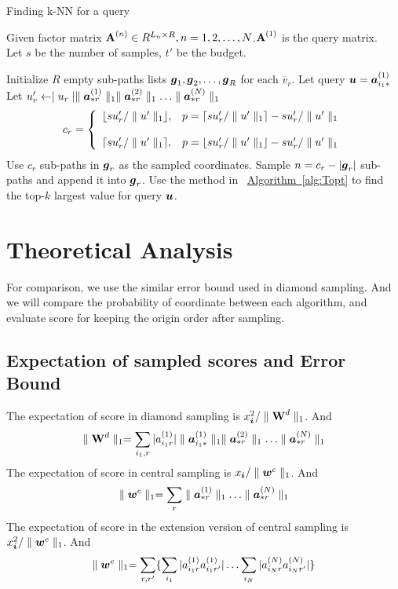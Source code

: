 \documentclass[letterpaper]{article}
\newcommand{\Sca}[3]{{#1}^{(#2)}_{i_#2#3}}%
\newcommand{\V}[1]{{\bm{{\MakeLowercase{#1}}}}}
\newcommand{\VnC}[3]{\V{#1}^{(#2)}_{#3}}
\newcommand{\Varow}[1]{\V{a}^{(#1)}_{i_#1*}}
\newcommand{\Vacol}[1]{\V{a}^{(#1)}_{*r}}
\newcommand{\M}[1]{{\bm{\mathbf{\MakeUppercase{#1}}}}}
\newcommand{\norm}[2]{\parallel#1\parallel_{#2}}
\newcommand{\Alg}[1] {\hyperref[alg:#1] {Algorithm~\ref*{alg:#1}}}
\begin{document}
\begin{algorithm}[t]
    \caption{Finding k-NN for a query}
    \label{alg:QuerySampling}
        Given factor matrix $\M{A}^{(n)}\in R^{L_n\times R}, n = 1,2,\ldots,N$.$\M{A}^{(1)}$ is the query matrix.\\
        Let $s$ be the number of samples, $t'$ be the budget.
    \begin{algorithmic}[1]
    \State Initialize $R$ empty sub-paths lists $\V{g}_1,\V{g}_2,\ldots,\V{g}_R$ for each $\overline{v}_r$.
    \State Let query $\V{u}=\VnC{a}{1}{i_1*}$
    \State Let $u'_r \leftarrow \mid u_r\mid \norm{\Vacol{1}}{1} \norm{\Vacol{2}}{1} \ldots \norm{\Vacol{N}}{1}$
    \EndFor
    \State
    \begin{equation*}c_r=
        \left\{
          \begin{array}{ll}
            \lfloor su'_r/\norm{u'}{1} \rfloor,
            & \hbox{$p=\lceil su'_r/\norm{u'}{1} \rceil - su'_r/\norm{u'}{1}$} \\\\
            \lceil su'_r/\norm{u'}{1} \rceil,
            & \hbox{$p=\lfloor su'_r/\norm{u'}{1} \rfloor - su'_r/\norm{u'}{1}$}
          \end{array}
        \right.
    \end{equation*}
    \EndFor
    \If {$c_r\leq |\V{g}_r|$ }
    \State Use $c_r$ sub-paths in $\V{g}_r$ as the sampled coordinates.
    \Else
    \State Sample $n = c_r - |\V{g}_r|$ sub-paths and append it into $\V{g}_r$.
    \EndIf
    \State Use the method in ~\Alg{Topt} to find the top-$k$ largest value for query $\V{u}$.
    \EndFor
    \EndFor
    \end{algorithmic}
\end{algorithm}


\section{Theoretical Analysis}

For comparison, we use the similar error bound used in diamond sampling. And we will compare the probability of coordinate between each algorithm, and evaluate score for keeping the origin order after sampling.

\subsection{Expectation of sampled scores and Error Bound}
The expectation of score in diamond sampling is $x^2_{\V{i}}/\norm{\M{W}^d}{1}$. And
\[
\norm{\M{W}^d}{1} = \sum_{i_1,r}|\Sca{a}{1}{r}|\norm{\Varow{1}}{1} \norm{\Vacol{2}}{1} \ldots \norm{\Vacol{N}}{1}
\]
The expectation of score in central sampling is $x_{\V{i}}/\norm{\V{W}^c}{1}$. And
\[
\norm{\V{W}^c}{1} = \sum_{r}\norm{\Vacol{1}}{1}\ldots\norm{\Vacol{N}}{1}
\]
The expectation of score in the extension version of central sampling is $x_{\V{i}}^2/\norm{\V{w}^e}{1}$. And
\[
\norm{\V{w}^e}{1} = \sum_{r,r'}\{\sum_{i_1}|\Sca{a}{1}{r}\Sca{a}{1}{r'}|\ldots\sum_{i_N}|\Sca{a}{N}{r}\Sca{a}{N}{r'}|\}
\]
\end{document}
